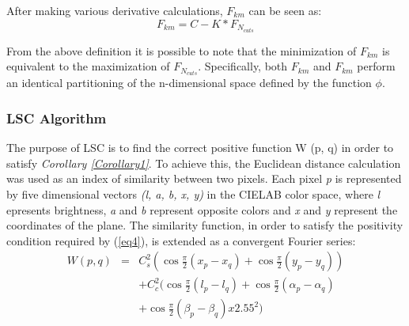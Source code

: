 After making various derivative calculations, $ F_{km} $ can be seen as: 
\begin{equation}
    F_{km} = C - K * F_{N_{cuts}} 
\end{equation}

From the above definition it is possible to note that the minimization of 
$ F_{km} $ is equivalent to the maximization of $ F_{N_{cuts}} $. Specifically, both $ F_{km} $ and 
$ F_{km} $ perform an identical partitioning of the n-dimensional space defined by 
the function $ \phi $.

\subsubsection{LSC Algorithm}
The purpose of LSC is to find the correct positive function W (p, q) in order 
to satisfy {\emph{Corollary \ref{Corollary1}}}. To achieve this, the Euclidean distance calculation 
was used as an index of similarity between two pixels. Each pixel \emph{p} is represented 
by five dimensional vectors \emph{(l, a, b, x, y)} in the CIELAB color space, where \emph{l} 
epresents brightness, \emph{a} and \emph{b} represent opposite colors and \emph{x} and \emph{y} represent
the coordinates of the plane. The similarity function, in order to satisfy 
the positivity condition required by (\ref{eq4}), is extended as a convergent Fourier series: 
\begin{eqnarray}
    W(p,q) & = & C_s^2(\cos \frac{\pi}{2}(x_p-x_q)+\cos\frac{\pi}{2}(y_p-y_q)) \nonumber \\
           &   &  + C_c^2(\cos \frac{\pi}{2}(l_p-l_q)+\cos\frac{\pi}{2}(\alpha_p-\alpha_q) \nonumber \\
           &   &  + \cos\frac{\pi}{2}(\beta_p-\beta_q)x2.55^2)    
\end{eqnarray}

